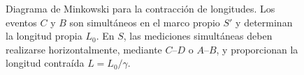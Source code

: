 \begin{figure}[H]
\caption{Diagrama de Minkowski para la contracción de longitudes. Los eventos $C$ y $B$ son simultáneos en el marco propio $S'$ y determinan la longitud propia $L_0$. En $S$, las mediciones simultáneas deben realizarse horizontalmente, mediante $C$--$D$ o $A$--$B$, y proporcionan la longitud contraída $L=L_0/\gamma$.}
\label{fig:contraccion}
\end{figure}
